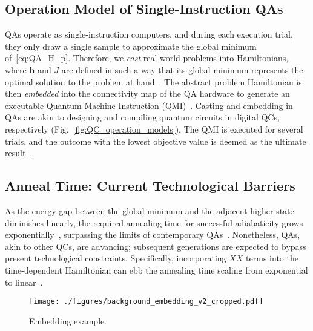 \subsection{Operation Model of Single-Instruction QAs}

QAs operate as single-instruction computers, and during each execution trial, they only draw a single sample to approximate the global minimum of~\eqref{eq:QA_H_p}.
Therefore, we \emph{cast} real-world problems into Hamiltonians, where $\mathbf{h}$ and ${J}$ are defined in such a way that its global minimum represents the optimal solution to the problem at hand~\cite{albash2018adiabatic,ayanzadeh2022equal}.
The abstract problem Hamiltonian is then \emph{embedded} into the connectivity map of the QA hardware to generate an executable Quantum Machine Instruction (QMI)~\cite{minorminerGithub,cai2014practical}. 
Casting and embedding in QAs are akin to designing and compiling quantum circuits in digital QCs, respectively (Fig.~\ref{fig:QC_operation_models}). 
The QMI is executed for several trials, and the outcome with the lowest objective value is deemed as the ultimate result~\cite{ayanzadeh2022equal}. 



\subsection{Anneal Time: Current Technological Barriers}

As the energy gap between the global minimum and the adjacent higher state diminishes linearly, the required annealing time for successful adiabaticity grows exponentially~\cite{albash2018adiabatic,das2008colloquium}, surpassing the limits of contemporary QAs~\cite{yan2022analytical}. 
Nonetheless, QAs, akin to other QCs, are advancing; subsequent generations are expected to bypass present technological constraints. 
Specifically, incorporating $XX$ terms into the time-dependent Hamiltonian can ebb the annealing time scaling from exponential to linear~\cite{nishimori2017exponential}.



\begin{figure}[t]
    \centering
    \texttt{[image: ./figures/background\_embedding\_v2\_cropped.pdf]}
    \caption{
        Embedding example.
}       
    \label{fig:background_embedding}
\end{figure}  


